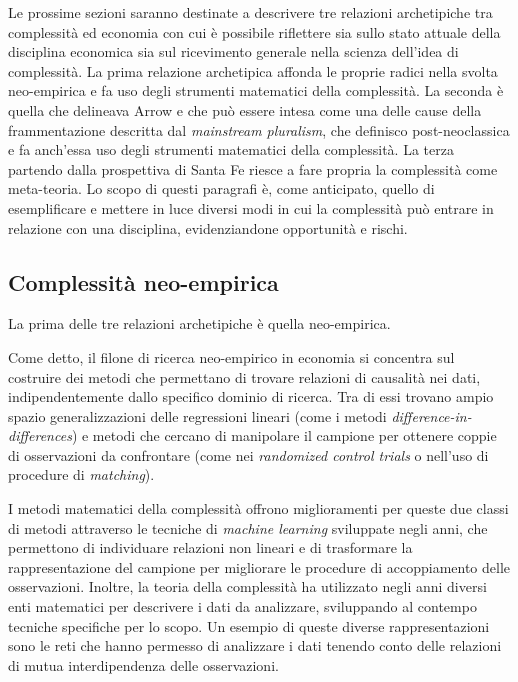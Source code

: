 \documentclass[a4paper, headings=standardclasses]{scrartcl}
\begin{document}
Le prossime sezioni saranno destinate a descrivere tre relazioni archetipiche tra complessità ed economia con cui è possibile riflettere sia sullo stato attuale della disciplina economica sia sul ricevimento generale nella scienza dell'idea di complessità.
La prima relazione archetipica affonda le proprie radici nella svolta neo-empirica e fa uso degli strumenti matematici della complessità. La seconda è quella che delineava Arrow e che può essere intesa come una delle cause della frammentazione descritta dal \textit{mainstream pluralism}, che definisco post-neoclassica e fa anch'essa uso degli strumenti matematici della complessità.
La terza partendo dalla prospettiva di Santa Fe riesce a fare propria la complessità come meta-teoria.
Lo scopo di questi paragrafi è, come anticipato, quello di esemplificare e mettere in luce diversi modi in cui la complessità può entrare in relazione con una disciplina, evidenziandone opportunità e rischi.

\subsection{Complessità neo-empirica}
La prima delle tre relazioni archetipiche è quella neo-empirica.

Come detto, il filone di ricerca neo-empirico in economia si concentra sul costruire dei metodi che permettano di trovare relazioni di causalità nei dati, indipendentemente dallo specifico dominio di ricerca. Tra di essi trovano ampio spazio generalizzazioni delle regressioni lineari (come i metodi \textit{difference-in-differences}) e metodi che cercano di manipolare il campione per ottenere coppie di osservazioni da confrontare (come nei \textit{randomized control trials} o nell'uso di procedure di \textit{matching}).

I metodi matematici della complessità offrono miglioramenti per queste due classi di metodi attraverso le tecniche di \textit{machine learning} sviluppate negli anni, che permettono di individuare relazioni non lineari e di trasformare la rappresentazione del campione per migliorare le procedure di accoppiamento delle osservazioni.
Inoltre, la teoria della complessità ha utilizzato negli anni diversi enti matematici per descrivere i dati da analizzare, sviluppando al contempo tecniche specifiche per lo scopo.
Un esempio di queste diverse rappresentazioni sono le reti che hanno permesso di analizzare i dati tenendo conto delle relazioni di mutua interdipendenza delle osservazioni.
\end{document}
